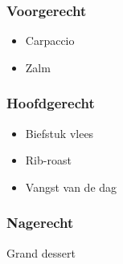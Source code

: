 \subsubsection*{Voorgerecht}
\begin{itemize}
	\item Carpaccio
	\item Zalm
\end{itemize}

\subsubsection*{Hoofdgerecht}
\begin{itemize}
	\item Biefstuk vlees
	\item Rib-roast
	\item Vangst van de dag
\end{itemize}

\subsubsection*{Nagerecht}
Grand dessert
